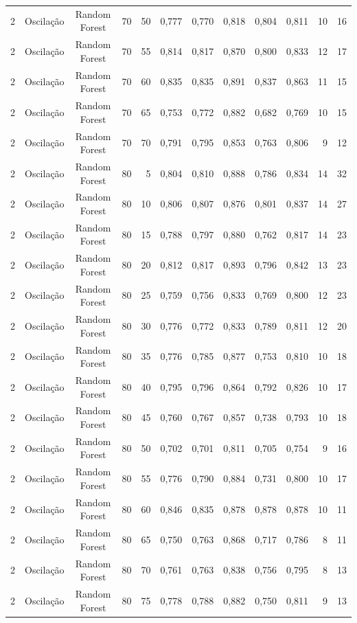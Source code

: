 \begin{longtable}{ccclrrrrrrrr}
2 & Oscilação & Random Forest & 70 & 50 & 0,777 & 0,770 & 0,818 & 0,804 & 0,811 & 10 & 16 \\
2 & Oscilação & Random Forest & 70 & 55 & 0,814 & 0,817 & 0,870 & 0,800 & 0,833 & 12 & 17 \\
2 & Oscilação & Random Forest & 70 & 60 & 0,835 & 0,835 & 0,891 & 0,837 & 0,863 & 11 & 15 \\
2 & Oscilação & Random Forest & 70 & 65 & 0,753 & 0,772 & 0,882 & 0,682 & 0,769 & 10 & 15 \\
2 & Oscilação & Random Forest & 70 & 70 & 0,791 & 0,795 & 0,853 & 0,763 & 0,806 & 9 & 12 \\
2 & Oscilação & Random Forest & 80 & 5 & 0,804 & 0,810 & 0,888 & 0,786 & 0,834 & 14 & 32 \\
2 & Oscilação & Random Forest & 80 & 10 & 0,806 & 0,807 & 0,876 & 0,801 & 0,837 & 14 & 27 \\
2 & Oscilação & Random Forest & 80 & 15 & 0,788 & 0,797 & 0,880 & 0,762 & 0,817 & 14 & 23 \\
2 & Oscilação & Random Forest & 80 & 20 & 0,812 & 0,817 & 0,893 & 0,796 & 0,842 & 13 & 23 \\
2 & Oscilação & Random Forest & 80 & 25 & 0,759 & 0,756 & 0,833 & 0,769 & 0,800 & 12 & 23 \\
2 & Oscilação & Random Forest & 80 & 30 & 0,776 & 0,772 & 0,833 & 0,789 & 0,811 & 12 & 20 \\
2 & Oscilação & Random Forest & 80 & 35 & 0,776 & 0,785 & 0,877 & 0,753 & 0,810 & 10 & 18 \\
2 & Oscilação & Random Forest & 80 & 40 & 0,795 & 0,796 & 0,864 & 0,792 & 0,826 & 10 & 17 \\
2 & Oscilação & Random Forest & 80 & 45 & 0,760 & 0,767 & 0,857 & 0,738 & 0,793 & 10 & 18 \\
2 & Oscilação & Random Forest & 80 & 50 & 0,702 & 0,701 & 0,811 & 0,705 & 0,754 & 9 & 16 \\
2 & Oscilação & Random Forest & 80 & 55 & 0,776 & 0,790 & 0,884 & 0,731 & 0,800 & 10 & 17 \\
2 & Oscilação & Random Forest & 80 & 60 & 0,846 & 0,835 & 0,878 & 0,878 & 0,878 & 10 & 11 \\
2 & Oscilação & Random Forest & 80 & 65 & 0,750 & 0,763 & 0,868 & 0,717 & 0,786 & 8 & 11 \\
2 & Oscilação & Random Forest & 80 & 70 & 0,761 & 0,763 & 0,838 & 0,756 & 0,795 & 8 & 13 \\
2 & Oscilação & Random Forest & 80 & 75 & 0,778 & 0,788 & 0,882 & 0,750 & 0,811 & 9 & 13 \\

\end{longtable}
